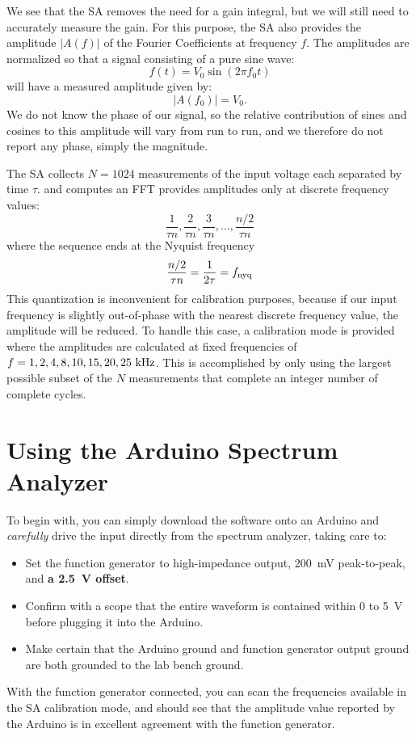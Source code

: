 \documentclass[12pt]{article}
\begin{document}
We see that the SA removes the need for a gain integral, but we will still need to accurately measure the gain.  For this purpose, the SA also provides the amplitude $|A(f)|$ of the Fourier Coefficients at frequency $f$.  The amplitudes are normalized so that a signal consisting of a pure sine wave:
\begin{displaymath}
f(t) = V_0 \sin(2\pi f_0 t)
\end{displaymath}
will have a measured amplitude given by:
\begin{displaymath}
|A(f_0)| = V_0.
\end{displaymath}
We do not know the phase of our signal, so the relative contribution of sines and cosines to this amplitude will vary from run to run, and we therefore do not report any phase, simply the magnitude.

The SA collects $N=1024$ measurements of the input voltage each separated by time $\tau$. and computes an FFT provides amplitudes only at discrete frequency values:
\begin{displaymath}
\frac{1}{\tau n} , \frac{2}{\tau n} , \frac{3}{\tau n}, ...,\frac{n/2}{\tau n}
\end{displaymath}
where the sequence ends at the Nyquist frequency
\begin{displaymath}
\frac{n/2}{\tau n}=\frac{1}{2\tau}=f_{\rm nyq}
\end{displaymath}
This quantization is inconvenient for calibration purposes, because if our input frequency is slightly out-of-phase with the nearest discrete frequency value, the amplitude will be reduced.  To handle this case, a calibration mode is provided where the amplitudes are calculated at fixed frequencies of $f=1,2,4,8,10,15,20,25~{\rm kHz}$.  This is accomplished by only using the largest possible subset of the $N$ measurements that complete an integer number of complete cycles.

\section{Using the Arduino Spectrum Analyzer}

To begin with, you can simply download the software onto an Arduino and {\em carefully} drive the input directly from the spectrum analyzer, taking care to:
\begin{itemize}
\item Set the function generator to high-impedance output, 200~mV peak-to-peak, and {\bf a 2.5~V offset}.
\item Confirm with a scope that the entire waveform is contained within 0 to 5~V before plugging it into the Arduino.
\item Make certain that the Arduino ground and function generator output ground are both grounded to the lab bench ground.
\end{itemize}
With the function generator connected, you can scan the frequencies available in the SA calibration mode, and should see that the amplitude value reported by the Arduino is in excellent agreement with the function generator.
\end{document}
